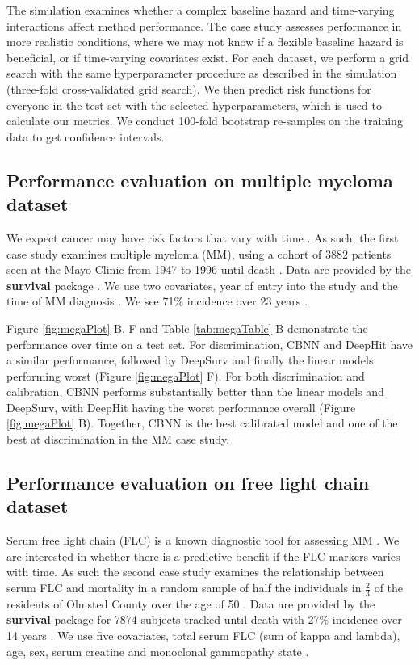 \documentclass[preprint,12pt]{elsarticle}
\begin{document}
The simulation examines whether a complex baseline hazard and time-varying interactions affect method performance.
The case study assesses performance in more realistic conditions, where we may not know if a flexible baseline hazard is beneficial, or if time-varying covariates
exist. For each dataset, we perform a grid search with the same hyperparameter procedure as described in the simulation (three-fold cross-validated grid search).
We then predict risk functions for everyone in the test set with the selected hyperparameters, which is used to calculate our metrics. We conduct 100-fold
bootstrap re-samples on the training data to get confidence intervals.

\hypertarget{pe-multiplemyeloma}{%
\subsection{Performance evaluation on multiple myeloma dataset}\label{pe-multiplemyeloma}}
We expect cancer may have risk factors that vary with time \citep{coradini2000time}. As such, the first case study examines multiple myeloma (MM),
using a cohort of 3882 patients seen at the Mayo Clinic from 1947 to 1996 until death \citep{myeloma}. Data are provided by the \textbf{survival} package \citep{survpkg}.
We use two covariates, year of entry into the study and the time of MM diagnosis \citep{myeloma}. We see 71\% incidence over 23 years \citep{myeloma}.

Figure \ref{fig:megaPlot} B, F and Table \ref{tab:megaTable} B demonstrate the performance over time on a test set. For discrimination, CBNN and DeepHit have a
similar performance, followed by DeepSurv and finally the linear models performing worst (Figure \ref{fig:megaPlot} F). For both discrimination and calibration, CBNN
performs substantially better than the linear models and DeepSurv, with DeepHit having the worst performance overall (Figure \ref{fig:megaPlot} B). Together, CBNN
is the best calibrated model and one of the best at discrimination in the MM case study.


\hypertarget{pe-flc}{%
\subsection{Performance evaluation on free light chain dataset}\label{pe-flc}}
Serum free light chain (FLC) is a known diagnostic tool for assessing MM \citep{mm2flc}. We are interested in whether there is a predictive benefit if the FLC markers
varies with time. As such the second case study examines the relationship between serum FLC and mortality in a random sample of half the individuals in
$\frac{2}{3}$ of the residents of Olmsted County over the age of 50 \citep{flc}. Data are provided by the \textbf{survival} package \citep{survpkg} for 7874 subjects tracked
until death with 27\% incidence over 14 years \citep{flc}. We use five covariates, total serum FLC (sum of kappa and lambda), age, sex, serum creatine and monoclonal gammopathy state \citep{flc}.
\end{document}
